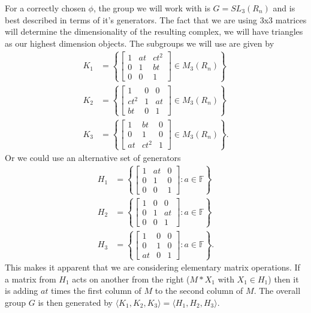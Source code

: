 \documentclass{article}
\newcommand{\set}[1]{\left\{ #1 \right\}}
\begin{document}
For a correctly chosen $\phi$, the group we will work with is $G = SL_3(R_n)$ and is best described in terms of it's generators. The fact that we are using 3x3 matrices will determine the dimensionality of the resulting complex, we will have triangles as our highest dimension objects. The subgroups we will use are given by
\begin{align}
    K_1 &= \set{\begin{bmatrix}1 & a t & c t^2 \\ 0 & 1 & b t \\ 0 & 0 & 1 \end{bmatrix} \in M_3(R_n)} \\
    K_2 &= \set{\begin{bmatrix}1 & 0 & 0 \\ c t^2 & 1 & a t \\ b t & 0 & 1 \end{bmatrix} \in M_3(R_n)} \\
    K_3 &= \set{\begin{bmatrix}1 & b t & 0 \\ 0 & 1 & 0 \\ at & ct^2 & 1 \end{bmatrix} \in M_3(R_n)}.
\end{align}
Or we could use an alternative set of generators
\begin{align}
    H_1 &= \set{ \begin{bmatrix} 1 & a t & 0 \\ 0 & 1 & 0 \\ 0 & 0 & 1 \end{bmatrix} : a \in \mathbb{F}} \\
    H_2 &= \set{\begin{bmatrix} 1 & 0 & 0 \\ 0 & 1 & at \\ 0 & 0 & 1 \end{bmatrix}: a \in \mathbb{F}} \\
    H_3 &= \set{ \begin{bmatrix} 1 & 0 & 0 \\ 0 & 1 & 0 \\ at & 0 & 1 \end{bmatrix} : a \in \mathbb{F}}.
\end{align}
This makes it apparent that we are considering elementary matrix operations. If a matrix from $H_1$ acts on another from the right ($M * X_1$ with $X_1 \in H_1$) then it is adding $at$ times the first column of $M$ to the second column of $M$. The overall group $G$ is then generated by $\langle K_1, K_2, K_3 \rangle = \langle H_1, H_2, H_3 \rangle$. 
\end{document}
